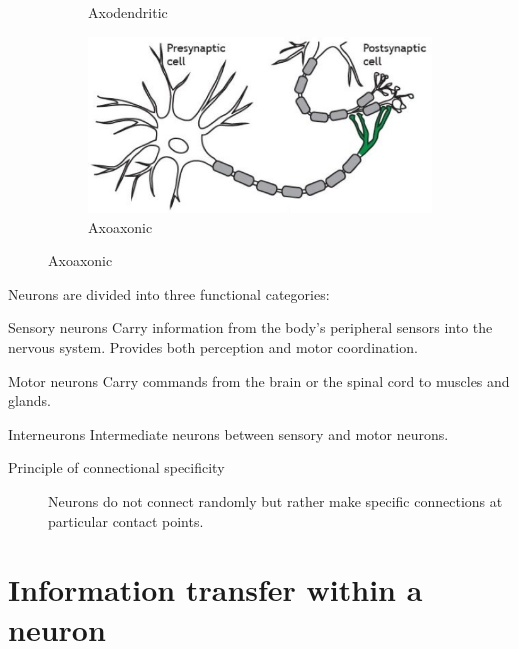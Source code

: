 \begin{descriptionlist}
\begin{figure}[h]
\begin{subfigure}{.3\textwidth}
            \caption{Axodendritic}
        \end{subfigure}
        \begin{subfigure}{.3\textwidth}
            \centering
            \includegraphics[width=\linewidth]{./img/axoaxonic.png}
            \caption{Axoaxonic}
        \end{subfigure}
    \end{figure}
\end{descriptionlist}

Neurons are divided into three functional categories:
\begin{descriptionlist}
    \item[Sensory neurons] 
        Carry information from the body's peripheral sensors into the nervous system.
        Provides both perception and motor coordination.

    \item[Motor neurons] 
        Carry commands from the brain or the spinal cord to muscles and glands.

    \item[Interneurons] 
        Intermediate neurons between sensory and motor neurons.
\end{descriptionlist}

\begin{description}
    \item[Principle of connectional specificity] 
        Neurons do not connect randomly but rather make specific connections at particular contact points.
\end{description}



\section{Information transfer within a neuron}


